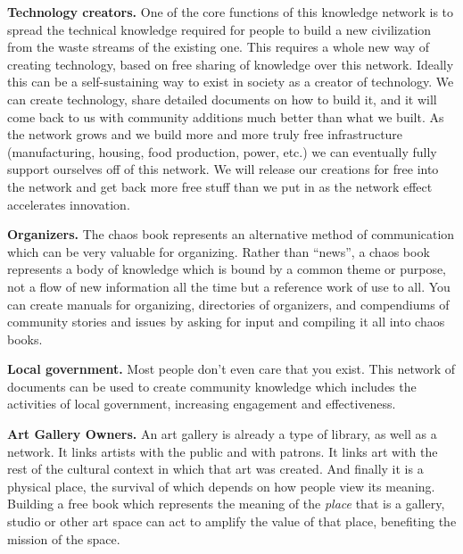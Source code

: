 \textbf{Technology creators.} One of the core functions of this
knowledge network is to spread the technical knowledge required for
people to build a new civilization from the waste streams of the
existing one. This requires a whole new way of creating technology,
based on free sharing of knowledge over this network. Ideally this can
be a self-sustaining way to exist in society as a creator of technology.
We can create technology, share detailed documents on how to build it,
and it will come back to us with community additions much better than
what we built. As the network grows and we build more and more truly
free infrastructure (manufacturing, housing, food production, power,
etc.) we can eventually fully support ourselves off of this network. We
will release our creations for free into the network and get back more
free stuff than we put in as the network effect accelerates innovation.

\textbf{Organizers.} The chaos book represents an alternative method of
communication which can be very valuable for organizing. Rather than
``news'', a chaos book represents a body of knowledge which is bound by
a common theme or purpose, not a flow of new information all the time
but a reference work of use to all. You can create manuals for
organizing, directories of organizers, and compendiums of community
stories and issues by asking for input and compiling it all into chaos
books.

\textbf{Local government.} Most people don't even care that you exist.
This network of documents can be used to create community knowledge
which includes the activities of local government, increasing engagement
and effectiveness.

\textbf{Art Gallery Owners.} An art gallery is already a type of
library, as well as a network. It links artists with the public and with
patrons. It links art with the rest of the cultural context in which
that art was created. And finally it is a physical place, the survival
of which depends on how people view its meaning. Building a free book
which represents the meaning of the \emph{place} that is a gallery,
studio or other art space can act to amplify the value of that place,
benefiting the mission of the space.
